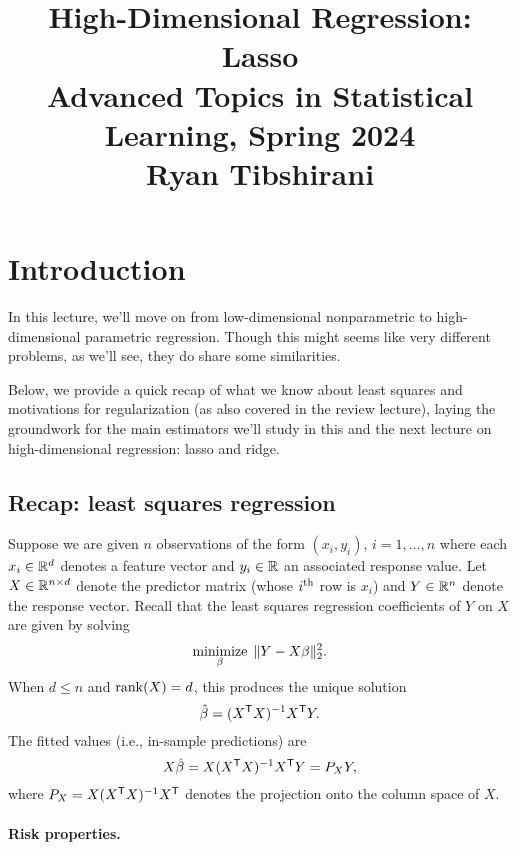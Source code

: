 \documentclass{article}
\title{High-Dimensional Regression: Lasso \\ \smallskip
\large Advanced Topics in Statistical Learning, Spring 2024 \\ \smallskip
Ryan Tibshirani}
\date{}
\begin{document}
\maketitle
\RaggedRight
\vspace{-50pt}

\section{Introduction}

In this lecture, we'll move on from low-dimensional nonparametric to
high-dimensional parametric regression. Though this might seems like very  
different problems, as we'll see, they do share some similarities.

Below, we provide a quick recap of what we know about least squares and
motivations for regularization (as also covered in the review lecture), laying
the groundwork for the main estimators we'll study in this and the next lecture
on high-dimensional regression: lasso and ridge.  

\subsection{Recap: least squares regression}

Suppose we are given $n$ observations of the form $(x_i, y_i)$, $i=1,\dots,n$
where each $x_i \in \mathbb{R}^d$ denotes a feature vector and $y_i \in \mathbb{R}$ an
associated response value. Let $X \in \mathbb{R}^{n \times d}$ denote the predictor
matrix (whose $i^{\textnormal{th}}$ row is $x_i$) and $Y \in \mathbb{R}^n$ denote the response 
vector. Recall that the least squares regression coefficients of $Y$ on $X$ are
given by solving  
\begin{equation}
\label{eq:ls}
\operatorname*{minimize}_\beta \; \|Y - X\beta\|_2^2.
\end{equation}
When $d \leq n$ and $\operatorname{rank}(X) = d$, this produces the unique solution 
\[
\hat{\beta} = (X^{\mathsf{T}} X)^{-1} X^{\mathsf{T}} Y.  
\]
The fitted values (i.e., in-sample predictions) are 
\[
X\hat{\beta} = X (X^{\mathsf{T}} X)^{-1} X^{\mathsf{T}} Y = P_X Y,
\]
where $P_X = X (X^{\mathsf{T}} X)^{-1} X^{\mathsf{T}} $ denotes the projection onto the column space
of $X$. 

\paragraph{Risk properties.}
\end{document}
